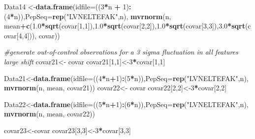 \documentclass[]{article}
\newenvironment{Shaded}{\begin{snugshade}}{\end{snugshade}}
\newcommand{\KeywordTok}[1]{\textcolor[rgb]{0.13,0.29,0.53}{\textbf{#1}}}
\newcommand{\DataTypeTok}[1]{\textcolor[rgb]{0.13,0.29,0.53}{#1}}
\newcommand{\DecValTok}[1]{\textcolor[rgb]{0.00,0.00,0.81}{#1}}
\newcommand{\FloatTok}[1]{\textcolor[rgb]{0.00,0.00,0.81}{#1}}
\newcommand{\StringTok}[1]{\textcolor[rgb]{0.31,0.60,0.02}{#1}}
\newcommand{\CommentTok}[1]{\textcolor[rgb]{0.56,0.35,0.01}{\textit{#1}}}
\newcommand{\OperatorTok}[1]{\textcolor[rgb]{0.81,0.36,0.00}{\textbf{#1}}}
\newcommand{\NormalTok}[1]{#1}
\begin{document}
\begin{Shaded}
\begin{Highlighting}[]
\NormalTok{Data14 <-}\KeywordTok{data.frame}\NormalTok{(}\DataTypeTok{idfile=}\NormalTok{((}\DecValTok{3}\OperatorTok{*}\NormalTok{n }\OperatorTok{+}\StringTok{ }\DecValTok{1}\NormalTok{)}\OperatorTok{:}\NormalTok{(}\DecValTok{4}\OperatorTok{*}\NormalTok{n)),}\DataTypeTok{PepSeq=}\KeywordTok{rep}\NormalTok{(}\StringTok{"LVNELTEFAK"}\NormalTok{,n),}
                  \KeywordTok{mvrnorm}\NormalTok{(n, mean}\OperatorTok{+}\KeywordTok{c}\NormalTok{(}\FloatTok{1.0}\OperatorTok{*}\KeywordTok{sqrt}\NormalTok{(covar[}\DecValTok{1}\NormalTok{,}\DecValTok{1}\NormalTok{]),}\FloatTok{1.0}\OperatorTok{*}\KeywordTok{sqrt}\NormalTok{(covar[}\DecValTok{2}\NormalTok{,}\DecValTok{2}\NormalTok{]),}\FloatTok{1.0}\OperatorTok{*}\KeywordTok{sqrt}\NormalTok{(covar[}\DecValTok{3}\NormalTok{,}\DecValTok{3}\NormalTok{]),}\FloatTok{3.0}\OperatorTok{*}\KeywordTok{sqrt}\NormalTok{(covar[}\DecValTok{4}\NormalTok{,}\DecValTok{4}\NormalTok{])), }
\NormalTok{                          covar))}

\CommentTok{#generate out-of-control observations for a 3 sigma fluctuation in all features large shift}
\NormalTok{covar21<-}\StringTok{ }\NormalTok{covar}
\NormalTok{covar21[}\DecValTok{1}\NormalTok{,}\DecValTok{1}\NormalTok{]<-}\DecValTok{3}\OperatorTok{*}\NormalTok{covar[}\DecValTok{1}\NormalTok{,}\DecValTok{1}\NormalTok{]}

\NormalTok{Data21<-}\KeywordTok{data.frame}\NormalTok{(}\DataTypeTok{idfile=}\NormalTok{((}\DecValTok{4}\OperatorTok{*}\NormalTok{n}\OperatorTok{+}\DecValTok{1}\NormalTok{)}\OperatorTok{:}\NormalTok{(}\DecValTok{5}\OperatorTok{*}\NormalTok{n)),}\DataTypeTok{PepSeq=}\KeywordTok{rep}\NormalTok{(}\StringTok{"LVNELTEFAK"}\NormalTok{,n),}
                  \KeywordTok{mvrnorm}\NormalTok{(n, mean, }
\NormalTok{                          covar21))}
\NormalTok{covar22<-}\StringTok{ }\NormalTok{covar}
\NormalTok{covar22[}\DecValTok{2}\NormalTok{,}\DecValTok{2}\NormalTok{]<-}\DecValTok{3}\OperatorTok{*}\NormalTok{covar[}\DecValTok{2}\NormalTok{,}\DecValTok{2}\NormalTok{]}

\NormalTok{Data22<-}\KeywordTok{data.frame}\NormalTok{(}\DataTypeTok{idfile=}\NormalTok{((}\DecValTok{5}\OperatorTok{*}\NormalTok{n}\OperatorTok{+}\DecValTok{1}\NormalTok{)}\OperatorTok{:}\NormalTok{(}\DecValTok{6}\OperatorTok{*}\NormalTok{n)),}\DataTypeTok{PepSeq=}\KeywordTok{rep}\NormalTok{(}\StringTok{"LVNELTEFAK"}\NormalTok{,n),}
                  \KeywordTok{mvrnorm}\NormalTok{(n, mean, }
\NormalTok{                          covar22))}


\NormalTok{covar23<-covar}
\NormalTok{covar23[}\DecValTok{3}\NormalTok{,}\DecValTok{3}\NormalTok{]<-}\DecValTok{3}\OperatorTok{*}\NormalTok{covar[}\DecValTok{3}\NormalTok{,}\DecValTok{3}\NormalTok{]}


\end{Highlighting}
\end{Shaded}
\end{document}
